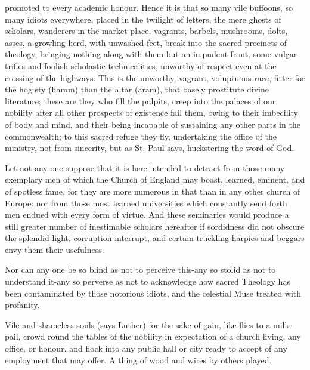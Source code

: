 {{{promoted to every academic honour. Hence it is that so many vile buffoons, so
many idiots everywhere, placed in the twilight of letters, the mere ghosts of
scholars, wanderers in the market place, vagrants, barbels, mushrooms, dolts,
asses, a growling herd, with unwashed feet, break into the sacred precincts of
theology, bringing nothing along with them but an impudent front, some vulgar
trifles and foolish scholastic technicalities, unworthy of respect even at the
crossing of the highways. This is the unworthy, vagrant, voluptuous race,
fitter for the hog sty (haram) than the altar (aram), that basely prostitute
divine literature; these are they who fill the pulpits, creep into the palaces
of our nobility after all other prospects of existence fail them, owing to
their imbecility of body and mind, and their being incapable of sustaining any
other parts in the commonwealth; to this sacred refuge they fly, undertaking
the office of the ministry, not from sincerity, but as St. Paul says,
huckstering the word of God.

Let not any one suppose that it is here intended to detract from those many
exemplary men of which the Church of England may boast, learned, eminent, and
of spotless fame, for they are more numerous in that than in any other church
of Europe: nor from those most learned universities which constantly send forth
men endued with every form of virtue. And these seminaries would produce a
still greater number of inestimable scholars hereafter if sordidness did not
obscure the splendid light, corruption interrupt, and certain truckling harpies
and beggars envy them their usefulness.

Nor can any one be so blind as not to perceive this-any so stolid as not to
understand it-any so perverse as not to acknowledge how sacred Theology has
been contaminated by those notorious idiots, and the celestial Muse treated
with profanity.

Vile and shameless souls (says Luther) for the sake of gain, like flies to a
milk-pail, crowd round the tables of the nobility in expectation of a church
living, any office, or honour, and flock into any public hall or city ready to
accept of any employment that may offer. A thing of wood and wires by others
played.

}}}
